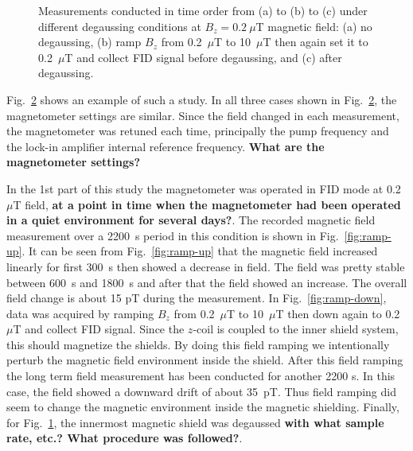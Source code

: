 \begin{figure}
\begin{subfigure}[b]{0.42\textwidth}
    \caption{}
    \label{fig:degauss}
  \end{subfigure}
  \caption{Measurements conducted in time order from (a) to (b) to (c)
    under different degaussing conditions at $B_z=0.2~\mu$T magnetic
    field: (a) no degaussing, (b) ramp $B_z$ from 0.2~$\mu$T to
    10~$\mu$T then again set it to 0.2~$\mu$T and collect FID signal
    before degaussing, and (c) after degaussing.}
  \label{fig:ramp-updown}
\end{figure}

Fig.~\ref{fig:ramp-updown} shows an example of such a study.  In all
three cases shown in Fig.~\ref{fig:ramp-updown}, the magnetometer
settings are similar.  Since the field changed in each measurement,
the magnetometer was retuned each time, principally the pump frequency
and the lock-in amplifier internal reference frequency.  {\bf What are
  the magnetometer settings?}
  

In the 1st part of this study the magnetometer was operated in FID
mode at 0.2~$\mu$T field, {\bf at a point in time when the
  magnetometer had been operated in a quiet environment for several
  days?}. The recorded magnetic field measurement over a 2200~s period
in this condition is shown in Fig.~\ref{fig:ramp-up}.  It can be seen
from Fig.~\ref{fig:ramp-up} that the magnetic field increased linearly
for first 300~s then showed a decrease in field. The field was pretty
stable between 600~s and 1800~s and after that the field showed an
increase. The overall field change is about 15 pT during the
measurement.  In Fig.~\ref{fig:ramp-down}, data was acquired by
ramping $B_z$ from 0.2~$\mu$T to 10~$\mu$T then down again to
0.2~$\mu$T and collect FID signal.  Since the $z$-coil is coupled to
the inner shield system, this should magnetize the shields.  By doing
this field ramping we intentionally perturb the magnetic field
environment inside the shield.  After this field ramping the long term
field measurement has been conducted for another 2200 s. In this case,
the field showed a downward drift of about 35~pT.  Thus field ramping
did seem to change the magnetic environment inside the magnetic
shielding.  Finally, for Fig.~\ref{fig:degauss}, the innermost
magnetic shield was degaussed {\bf with what sample rate, etc.?%
What
  procedure was followed?}. 
  
